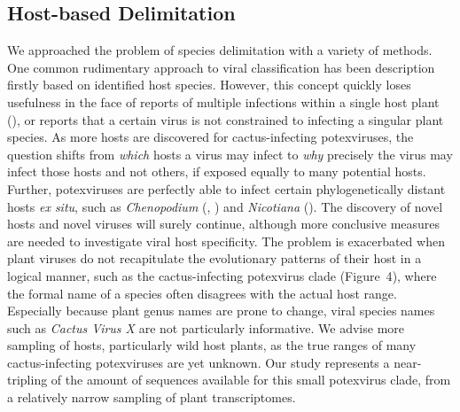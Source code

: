 \documentclass[fleqn,10pt,lineno]{wlpeerj}
\begin{document}
{\subsection*{Host-based Delimitation}
We approached the problem of species delimitation with a variety of methods. 
One common rudimentary approach to viral classification has been description firstly based on identified host species. 
However, this concept quickly loses usefulness in the face of reports of multiple infections within a single host plant (\citealt{li_viral_2015}), or reports that a certain virus is not constrained to infecting a singular plant species.
As more hosts are discovered for cactus-infecting potexviruses, the question shifts from \textit{which} hosts a virus may infect to \textit{why} precisely the virus may infect those hosts and not others, if exposed equally to many potential hosts.
Further, potexviruses are perfectly able to infect certain phylogenetically distant hosts \textit{ex situ}, such as \textit{Chenopodium} (\citealt{plese_vergleichende_1966}, \citealt{attathom_occurrence_1978}) and \textit{Nicotiana} (\citealt{casper_new_1969}).
The discovery of novel hosts and novel viruses will surely continue, although more conclusive measures are needed to investigate viral host specificity.
The problem is exacerbated when plant viruses do not recapitulate the evolutionary patterns of their host in a logical manner, such as the cactus-infecting potexvirus clade ({Figure~4}), where the formal name of a species often disagrees with the actual host range. 
Especially because plant genus names are prone to change, viral species names such as \textit{Cactus Virus X} are not particularly informative.
We advise more sampling of hosts, particularly wild host plants, as the true ranges of many cactus-infecting potexviruses are yet unknown. 
Our study represents a near-tripling of the amount of sequences available for this small potexvirus clade, from a relatively narrow sampling of plant transcriptomes.

}
\end{document}
